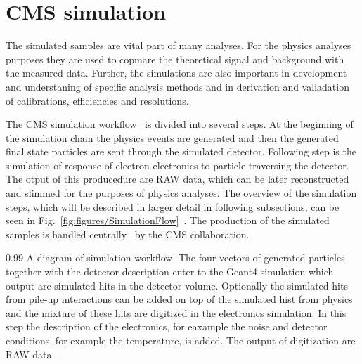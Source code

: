 
\clearpage

\setcounter{secnumdepth}{4}
\setcounter{secnumdepth}{5}


\section{CMS simulation}

The simulated samples are vital part of many analyses. For the physics analyses purposes they are used to copmare the theoretical signal and background with the measured data.  Further, the simulations are also important in development and understaning of specific analysis methods and in derivation and valiadation of calibrations, efficiencies and resolutions.

The CMS simulation workflow~\cite{Banerjee:2007zz, Hildreth:2017vpw, Hildreth:2015kps, website:simuBasics } is divided into several steps. At the beginning of the simulation chain the physics events are generated and then the generated final state particles are sent through the simulated detector. Following step is the simulation of response of electron electronics to particle traversing the detector. The otput of this producedure are RAW data, which can be later reconstructed and slimmed for the purposes of physics analyses. The overview of the simulation steps, which will be described in larger detail in following subsections, can be seen in Fig.~\ref{fig:figures/SimulationFlow}~\cite{website:simuBasics}. The production of the simulated samples is handled centrally~\cite{Boudoul:2015bkp} by the CMS collaboration.

                 {0.99}       %
                 { A diagram of simulation workflow. The four-vectors of generated particles together with the detector description enter to the Geant4 simulation which output are simulated hits in the detector volume. Optionally the simulated hits from pile-up interactions can be added on top of the simulated hist from physics and the mixture of these hits are digitized in the electronics simulation. In this step the description of the electronics, for eaxample the noise and detector conditions, for example the temperature, is added. The output of digitization are RAW data~\cite{website:simuBasics}. }

